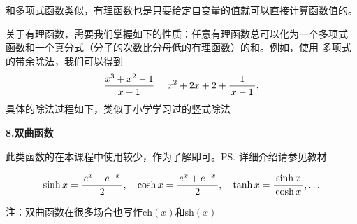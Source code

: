 和多项式函数类似，有理函数也是只要给定自变量的值就可以直接计算函数值的。

关于有理函数，需要我们掌握如下的性质：任意有理函数总可以化为一个多项式
函数和一个真分式（分子的次数比分母低的有理函数）的和。例如，使用
多项式的带余除法，我们可以得到
$$\frac{x^3+x^2-1}{x-1}=x^2+2x+2+\displaystyle\frac{\,{1}\,}{\,{x-1}\,},$$
具体的除法过程如下，类似于小学学习过的竖式除法
\begin{center}
\end{center}

{\bf 8.双曲函数}

此类函数的在本课程中使用较少，作为了解即可。\ps{详细介绍请参见教材}

$$\sinh x =\displaystyle\frac{\,{e^x-e^{-x}}\,}{\,{2}\,}, \quad
\cosh x =\displaystyle\frac{\,{e^x+e^{-x}}\,}{\,{2}\,}, \quad\tanh x=\displaystyle\frac{\,{\sinh
x}\,}{\,{\cosh x}\,}, \ldots$$

注：双曲函数在很多场合也写作$\mathrm{ch}(x)$和$\mathrm{sh}(x)$

\bigskip

